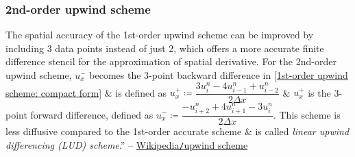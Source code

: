 \documentclass{article}
\begin{document}
\subsubsection{2nd-order upwind scheme}
The spatial accuracy of the 1st-order upwind scheme can be improved by including 3 data points instead of just 2, which offers a more accurate finite difference stencil for the approximation of spatial derivative. For the 2nd-order upwind scheme, $u_x^-$ becomes the 3-point backward difference in \eqref{1st-order upwind scheme: compact form} \& is defined as $u_x^+\coloneqq\dfrac{3u_i^n - 4u_{i-1}^n + u_{i-2}^n}{2\Delta x}$ \& $u_x^+$ is the 3-point forward difference, defined as $u_x^-\coloneqq\dfrac{-u_{i+2}^n + 4u_{i+1}^n - 3u_i^n}{2\Delta x}$. This scheme is less diffusive compared to the 1st-order accurate scheme \& is called {\it linear upwind differencing (LUD) scheme}.'' -- \href{https://en.wikipedia.org/wiki/Upwind_scheme}{Wikipedia{\tt/}upwind scheme}


\printbibliography[heading=bibintoc]
	
\end{document}
